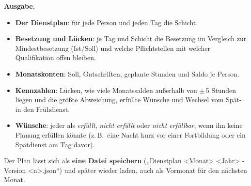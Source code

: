 \documentclass[11pt]{combiArticle}
\begin{document}
\textbf{Ausgabe.}
\begin{itemize}
  \item \textbf{Der Dienstplan}: für jede Person und jeden Tag die Schicht.
  \item \textbf{Besetzung und Lücken}: je Tag und Schicht die Besetzung im Vergleich zur Mindestbesetzung
        (Ist/Soll) und welche Pflichtstellen mit welcher Qualifikation offen bleiben.
  \item \textbf{Monatskonten}: Soll, Gutschriften, geplante Stunden und Saldo je Person.
  \item \textbf{Kennzahlen}: Lücken, wie viele Monatssalden außerhalb von $\pm$\,5 Stunden liegen und die größte
        Abweichung, erfüllte Wünsche und Wechsel vom Spät- in den Frühdienst.
  \item \textbf{Wünsche}: jeder als \emph{erfüllt}, \emph{nicht erfüllt} oder \emph{nicht erfüllbar}, wenn ihn
        keine Planung erfüllen könnte (z.\,B.\ eine Nacht kurz vor einer Fortbildung oder ein Spätdienst am Tag
        davor).
\end{itemize}
Der Plan lässt sich als \textbf{eine Datei speichern} („Dienstplan \textless Monat\textgreater{}
\textless Jahr\textgreater{} - Version \textless n\textgreater.json“) und später wieder laden, auch als Vormonat
für den nächsten Monat.
\end{document}

